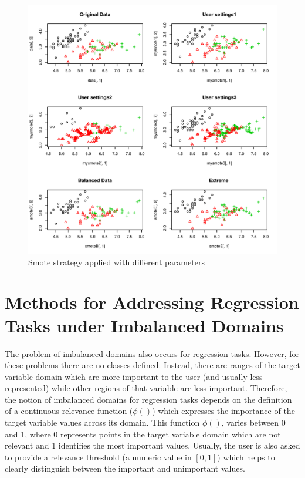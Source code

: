 \documentclass[10pt,a4paper]{article}\usepackage[]{graphicx}\usepackage[]{color}
\makeatletter
\def\maxwidth{ %
  \ifdim\Gin@nat@width>\linewidth
    \linewidth
  \else
    \Gin@nat@width
  \fi
}
\newenvironment{knitrout}{}{} %
\makeatother
\begin{document}
\begin{knitrout}\footnotesize
{}\color{fgcolor}\begin{figure}

{\centering \includegraphics[width=\maxwidth]{figures/UBL-smote_plot-1} 

}

\caption[Smote strategy applied with different parameters]{Smote strategy applied with different parameters}\label{fig:smote_plot}
\end{figure}


\end{knitrout}


\section{Methods for Addressing Regression Tasks under Imbalanced Domains}

The problem of imbalanced domains also occurs for regression tasks. However, for these problems there are no classes defined. Instead, there are ranges of the target variable domain which are more important to the user (and usually less represented) while other regions of that variable are less important. Therefore, the notion of imbalanced domains for regression tasks depends on the definition of a continuous relevance function ($\phi()$) which expresses the importance of the target variable values across its domain. This function $\phi()$, varies between 0 and 1, where 0 represents points in the target variable domain which are not relevant and 1 identifies the most important values. Usually, the user is also asked to provide a relevance threshold (a numeric value in $[0,1]$) which helps to clearly distinguish between the important and unimportant values.
\end{document}
